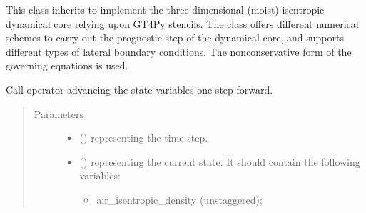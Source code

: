 \documentclass[letterpaper,10pt,english]{sphinxmanual}
\begin{document}
\begin{fulllineitems}
\label{\detokenize{api:tasmania.dycore.dycore_isentropic_nonconservative.DynamicalCoreIsentropicNonconservative}}
This class inherits {\hyperref[\detokenize{api:tasmania.dycore.dycore.DynamicalCore}]{}} to implement the three-dimensional
(moist) isentropic dynamical core relying upon GT4Py stencils. The class offers different numerical
schemes to carry out the prognostic step of the dynamical core, and supports different types of
lateral boundary conditions. The nonconservative form of the governing equations is used.

\begin{fulllineitems}
\label{\detokenize{api:tasmania.dycore.dycore_isentropic_nonconservative.DynamicalCoreIsentropicNonconservative.__call__}}
Call operator advancing the state variables one step forward.
\begin{quote}\begin{description}
\item[{Parameters}] \leavevmode\begin{itemize}
\item {} 
 () \textendash{}  representing the time step.

\item {} 
 () \textendash{} 
{\hyperref[\detokenize{api:tasmania.storages.state_isentropic.StateIsentropic}]{}} representing the current state.
It should contain the following variables:
\begin{itemize}
\item {} 
air\_isentropic\_density (unstaggered);


\end{itemize}
\end{itemize}
\end{description}
\end{quote}
\end{fulllineitems}
\end{fulllineitems}
\end{document}
